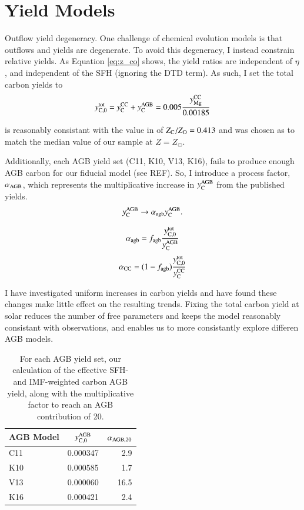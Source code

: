 \documentclass[12pt,oneside]{report}
\newcommand{\Ycc}{\ensuremath{y_{\rm C}^{\rm CC}}}
\newcommand{\Yct}{\ensuremath{y_{\rm C, 0}^{\rm tot}}}
\newcommand{\Yoc}{\ensuremath{y_{\rm Mg}^{\rm CC}}}
\newcommand{\Ycagb}{\ensuremath{y_{\rm C}^{\rm AGB}}}
\newcommand{\sun}{\ensuremath{\odot}}
\begin{document}
\section{Yield Models}

Outflow yield degeneracy.
One challenge of chemical evolution models is that outflows and yields are degenerate. To avoid this degeneracy, I instead constrain relative yields. As Equation \ref{eq:z_co} shows, the yield ratios are independent of $\eta$, and independent of the SFH (ignoring the DTD term).
As such, I set the total carbon yields to 
\begin{equation}
    \Yct = \Ycc + \Ycagb = 0.005 \frac{\Yoc}{0.00185}
\end{equation}

is reasonably consistant with the value in \citet{asplund+09} of $Z_{\rm
C}/Z_{\rm O}=0.413$ and was chosen as to match the median value of our sample
at $Z=Z_{\sun }$. 

Additionally, each AGB yield set (C11, K10, V13, K16), fails to produce enough AGB carbon for our fiducial model (see REF). So, I introduce a process factor, $\alpha_{\rm AGB}$, which represents the multiplicative increase in $\Ycagb$ from the published yields.
\begin{equation}
    \Ycagb \rightarrow \alpha_{\rm agb}  \Ycagb.
\end{equation}

\begin{equation}
    \alpha_{\rm agb} = f_{\rm agb} \frac{\Yct}{\Ycagb}
\end{equation}
\begin{equation}
    \alpha_{\rm CC} = (1 - f_{\rm agb}) \frac{\Yct}{\Ycc}
\end{equation}

I have investigated uniform increases in carbon yields and have found these changes make little effect on the resulting trends. Fixing the total carbon yield at solar reduces the number of free parameters and keeps the model reasonably consistant with observations, and enables us to more consistantly explore differen AGB models. 


\begin{table}
	\centering
    \caption[AGB net solar IMF yields]{For each AGB yield set, our calculation of the effective SFH- and IMF-weighted carbon AGB yield, along with the multiplicative factor to reach an AGB contribution of 20.}
	\label{tab:alpha_agb}
	\begin{tabular}{lcr} %
		\hline 
		AGB Model & $y_{\rm C, 0}^{\rm AGB}$ & $\alpha_{\rm AGB, 20}$\\
        \hline
        \hline
		C11 & 0.000347 & 2.9\\
		K10 & 0.000585 & 1.7\\
		V13 & 0.000060 & 16.5\\
		K16 & 0.000421 & 2.4\\
		\hline
	\end{tabular}
\end{table}
\end{document}
